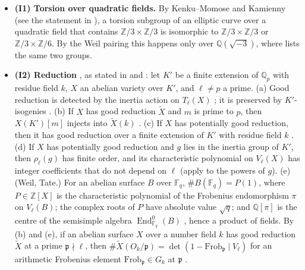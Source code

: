 \documentclass[11pt]{article}
\newcommand{\Q}{\mathbb Q}
\newcommand{\Z}{\mathbb Z}
\newcommand{\F}{\mathbb F}
\DeclareMathOperator{\End}{End}
\begin{document}
\begin{itemize}
\item \textbf{(I1) Torsion over quadratic fields.} By Kenku--Momose \cite[Theorem~(0.1)]{KM} and Kamienny
\cite{Ka} (see the statement in \cite[Section~1]{Na}), a torsion subgroup of an elliptic curve over a quadratic
field that contains \(\Z/3\times\Z/3\) is isomorphic to \(\Z/3\times\Z/3\) or \(\Z/3\times\Z/6\). By the Weil
pairing this happens only over \(\Q(\sqrt{-3})\), where \cite[Theorem~2(ii)]{Na} lists the same two groups.

\item \textbf{(I2) Reduction} \cite{ST}, as stated in \cite[Section~1]{P63} and \cite[(I2)]{P2214}: let \(K'\) be
a finite extension of \(\Q_p\) with residue field \(k\), \(X\) an abelian variety over \(K'\), and \(\ell\neq p\)
a prime. (a) Good reduction is detected by the inertia action on \(T_\ell(X)\) \cite[\S1, Theorem~1]{ST}; it is
preserved by \(K'\)-isogenies \cite[\S1, Corollary~2]{ST}. (b) If \(X\) has good reduction \(\widetilde X\) and
\(m\) is prime to \(p\), then \(X(K')[m]\) injects into \(\widetilde X(k)\) \cite[Lemma~2]{ST}. (c) If \(X\) has
potentially good reduction, then it has good reduction over a finite extension of \(K'\) with residue field
\(k\) \cite[\S2]{ST}. (d) If \(X\) has potentially good reduction and \(g\) lies in the inertia group of \(K'\),
then \(\rho_\ell(g)\) has finite order, and its characteristic polynomial on \(V_\ell(X)\) has integer coefficients
that do not depend on \(\ell\) (apply \cite[\S2, Theorem~2]{ST} to the powers of \(g\)). (e) (Weil, Tate.) For an abelian surface \(B\) over
\(\F_q\), \(\#B(\F_q)=P(1)\), where \(P\in\Z[X]\) is the characteristic polynomial of the Frobenius endomorphism
\(\pi\) on \(V_\ell(B)\); the complex roots of \(P\) have absolute value \(\sqrt q\); and \(\Q[\pi]\) is the centre
of the semisimple algebra \(\End^0_{\F_q}(B)\) \cite[Theorem~2(a)]{Ta}, hence a product of fields. By (b) and (e),
if an abelian surface \(X\) over a number field \(k\) has good reduction \(\widetilde X\) at a prime
\(\mathfrak p\nmid\ell\), then \(\#\widetilde X(O_k/\mathfrak p)=\det(1-\mathrm{Frob}_{\mathfrak p}\mid V_\ell)\)
for an arithmetic Frobenius element \(\mathrm{Frob}_{\mathfrak p}\in G_k\) at \(\mathfrak p\)
\cite[(I1)]{P2210}.


\end{itemize}
\end{document}
